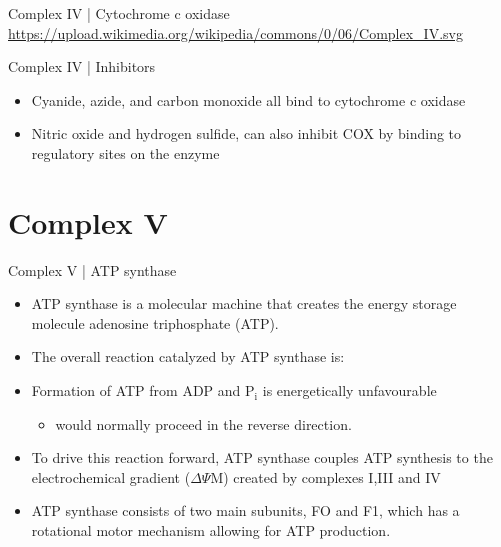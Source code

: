 \documentclass[presentation, smaller]{beamer}
\begin{document}
\begin{frame}[label={sec:org11ca29f}]{Complex IV | Cytochrome c oxidase}
\url{https://upload.wikimedia.org/wikipedia/commons/0/06/Complex\_IV.svg}
\end{frame}

\begin{frame}[label={sec:org406e44e}]{Complex IV | Inhibitors}
\begin{itemize}
\item Cyanide, azide, and carbon monoxide all bind to cytochrome c
oxidase

\item Nitric oxide and hydrogen sulfide, can also inhibit COX by
binding to regulatory sites on the enzyme
\end{itemize}
\end{frame}

\section{Complex V}
\label{sec:org3c84962}
\begin{frame}[label={sec:org8ea5348}]{Complex V | ATP synthase}
\begin{itemize}
\item ATP synthase is a molecular machine that creates the energy storage
molecule adenosine triphosphate (ATP).

\item The overall reaction catalyzed by ATP synthase is:
\end{itemize}

\centering


\begin{itemize}
\item Formation of ATP from ADP and P\(_{\text{i}}\) is energetically unfavourable
\begin{itemize}
\item would normally proceed in the reverse direction.
\end{itemize}

\item To drive this reaction forward, ATP synthase couples ATP synthesis
to the electrochemical gradient (\(\Delta \Psi\)M) created by complexes
I,III and IV

\item ATP synthase consists of two main subunits, FO and F1, which has a
rotational motor mechanism allowing for ATP production.
\end{itemize}
\end{frame}
\end{document}
